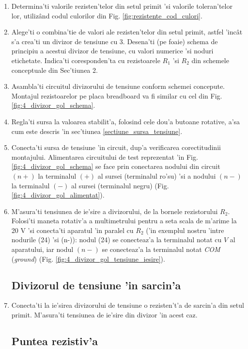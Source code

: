 \begin{enumerate}
\item Determina'ti valorile rezisten'telor din setul primit 'si valorile toleran'telor lor, utiliz\^and codul culorilor din Fig. \ref{fig:rezistente_cod_culori}.
\item Alege'ti o combina'tie de valori ale rezisten'telor din setul primit, astfel 'inc\^at s'a crea'ti un divizor de tensiune cu 3. Desena'ti (pe foaie) schema de principiu a acestui divizor de tensiune, cu valori numerice 'si noduri etichetate. Indica'ti coresponden'ta cu rezistoarele $R_1$ 'si $R_2$ din schemele conceptuale din Sec'tiunea 2.
\item Asambla'ti circuitul divizorului de tensiune conform schemei concepute. Montajul rezistoarelor pe placa breadboard va fi similar cu cel din Fig. \ref{fig:4_divizor_gol_schema}.
\item Regla'ti sursa la valoarea stabilit'a, folosind cele dou'a butoane rotative, a'sa cum este descris 'in sec'tiunea \ref{sectiune_sursa_tensiune}.
\item Conecta'ti sursa de tensiune 'in circuit, dup'a verificarea corectitudinii montajului. Alimentarea circuitului de test reprezentat 'in Fig. \ref{fig:4_divizor_gol_schema} se face prin conectarea nodului din circuit $(n+)$ la terminalul $(+)$ al sursei (terminalul ro'su) 'si a nodului $(n-)$ la terminalul $(-)$ al sursei (terminalul negru) (Fig. \ref{fig:4_divizor_gol_alimentat}).
\item M'asura'ti tensiunea de ie'sire a divizorului, de la bornele rezistorului $R_2$. Folosi'ti maneta rotativ'a a multimetrului pentru a seta scala de m'arime la 20 V 'si conecta'ti aparatul 'in paralel cu $R_2$ ('in exemplul nostru 'intre nodurile (24) 'si (n-)): nodul (24) se conecteaz'a la terminalul notat cu $V$ al aparatului, iar nodul $(n-)$ se conecteaz'a la terminalul notat \textit{COM} (\textit{ground}) (Fig. \ref{fig:4_divizor_gol_tensiune_iesire}).

\subsection{Divizorul de tensiune 'in sarcin'a}

\item Conecta'ti la ie'sirea divizorului de tensiune o rezisten't'a de sarcin'a din setul primit. M'asura'ti tensiunea de ie'sire din divizor 'in acest caz.

\subsection{Puntea rezistiv'a}


\end{enumerate}
